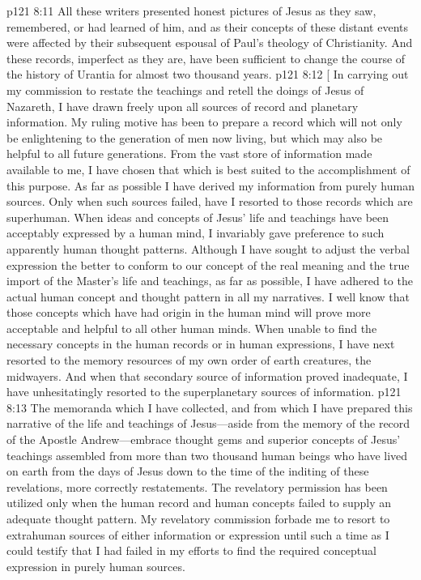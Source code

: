 \pc \vs p121 8:11 All these writers presented honest pictures of Jesus as they saw, remembered, or had learned of him, and as their concepts of these distant events were affected by their subsequent espousal of Paul’s theology of Christianity. And these records, imperfect as they are, have been sufficient to change the course of the history of Urantia for almost two thousand years.
\vsetoff
\vs p121 8:12 [ In carrying out my commission to restate the teachings and retell the doings of Jesus of Nazareth, I have drawn freely upon all sources of record and planetary information. My ruling motive has been to prepare a record which will not only be enlightening to the generation of men now living, but which may also be helpful to all future generations. From the vast store of information made available to me, I have chosen that which is best suited to the accomplishment of this purpose. As far as possible I have derived my information from purely human sources. Only when such sources failed, have I resorted to those records which are superhuman. When ideas and concepts of Jesus’ life and teachings have been acceptably expressed by a human mind, I invariably gave preference to such apparently human thought patterns. Although I have sought to adjust the verbal expression the better to conform to our concept of the real meaning and the true import of the Master’s life and teachings, as far as possible, I have adhered to the actual human concept and thought pattern in all my narratives. I well know that those concepts which have had origin in the human mind will prove more acceptable and helpful to all other human minds. When unable to find the necessary concepts in the human records or in human expressions, I have next resorted to the memory resources of my own order of earth creatures, the midwayers. And when that secondary source of information proved inadequate, I have unhesitatingly resorted to the superplanetary sources of information.\plusone
\vs p121 8:13 The memoranda which I have collected, and from which I have prepared this narrative of the life and teachings of Jesus---aside from the memory of the record of the Apostle Andrew---embrace thought gems and superior concepts of Jesus’ teachings assembled from more than two thousand human beings who have lived on earth from the days of Jesus down to the time of the inditing of these revelations, more correctly restatements. The revelatory permission has been utilized only when the human record and human concepts failed to supply an adequate thought pattern. My revelatory commission forbade me to resort to extrahuman sources of either information or expression until such a time as I could testify that I had failed in my efforts to find the required conceptual expression in purely human sources.
